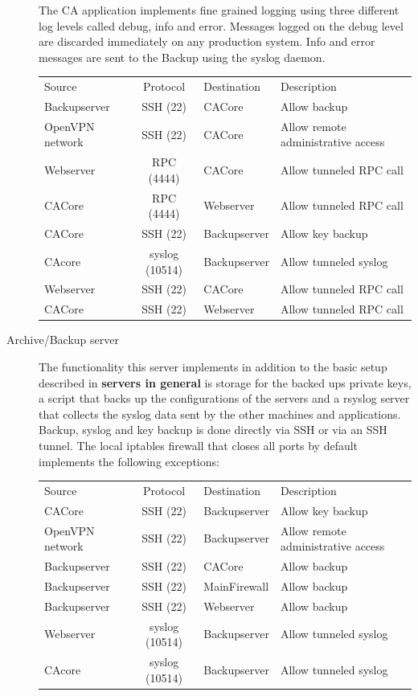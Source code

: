 \documentclass[a4paper, toc=index, 12pt, DIV14, twoside, BCOR2cm, headsepline, numbers=noenddot, bibliography=totoc]{scrbook}
\begin{document}
\begin{description}
The CA application implements fine grained logging using three different log levels called debug, info and error. Messages logged on the debug level are discarded immediately on any production system. Info and error messages are sent to the Backup using the syslog daemon.

\begin{tabular}{p{2.5cm} c l p{4.5cm}}
Source & Protocol & Destination & Description\\
\cline{1-4}
Backupserver & SSH (22) & CACore & Allow backup \\
\cline{1-4}
OpenVPN network & SSH (22) & CACore & Allow remote administrative access  \\
\cline{1-4}
Webserver & RPC (4444) & CACore & Allow tunneled RPC call \\
\cline{1-4}
CACore & RPC (4444) & Webserver & Allow tunneled RPC call \\
\cline{1-4}
CACore & SSH (22) & Backupserver & Allow key backup \\
\cline{1-4}
CAcore & syslog (10514) & Backupserver & Allow tunneled syslog\\
\cline{1-4}
Webserver & SSH (22) & CACore & Allow tunneled RPC call \\
\cline{1-4}
CACore & SSH (22) & Webserver & Allow tunneled RPC call \\
\end{tabular}


\item[Archive/Backup server ] The functionality this server implements in addition to the basic setup described in {\bfseries servers in general} is storage for the backed ups private keys, a script that backs up the configurations of the servers and a rsyslog server that collects the syslog data sent by the other machines and applications. Backup, syslog and key backup is done directly via SSH or via an SSH tunnel.\newline
The local iptables firewall that closes all ports by default implements the following exceptions:

\begin{tabular}{p{2.5cm} c l p{4.5cm}}
Source & Protocol & Destination & Description\\
\cline{1-4}
CACore & SSH (22) & Backupserver & Allow key backup\\
\cline{1-4}
OpenVPN network & SSH (22) &  Backupserver & Allow remote administrative access\\
\cline{1-4}
Backupserver & SSH (22) & CACore & Allow backup\\
\cline{1-4}
Backupserver & SSH (22) & MainFirewall & Allow backup\\
\cline{1-4}
Backupserver & SSH (22) & Webserver & Allow backup\\
\cline{1-4}
Webserver & syslog (10514) & Backupserver & Allow tunneled syslog\\
\cline{1-4}
CAcore & syslog (10514) & Backupserver & Allow tunneled syslog\\
\end{tabular}
\end{description}
\end{document}

